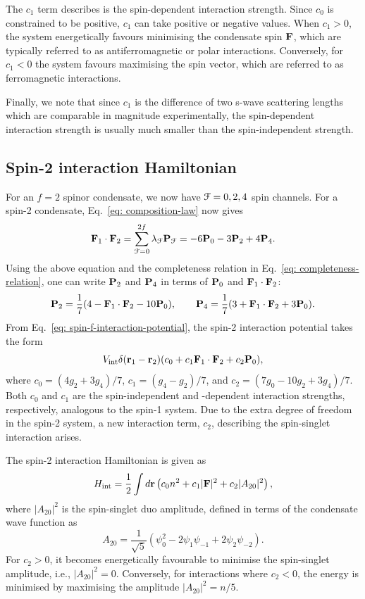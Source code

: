 The \(c_1\) term describes is the spin-dependent interaction strength.
Since \(c_0\) is constrained to be positive, \(c_1\) can take positive or
negative values.
When \(c_1 > 0\), the system energetically favours minimising the condensate
spin \(\vb{F}\), which are typically referred to as antiferromagnetic or polar
interactions.
Conversely, for \(c_1 < 0\) the system favours maximising the spin vector,
which are referred to as ferromagnetic interactions.

Finally, we note that since \(c_1\) is the difference of two s-wave scattering
lengths which are comparable in magnitude experimentally, the spin-dependent
interaction strength is usually much smaller than the spin-independent strength.

\subsection{Spin-2 interaction Hamiltonian}
For an \(f=2\) spinor condensate, we now have \(\EuScript{F}=0,2,4\) spin
channels.
For a spin-2 condensate, Eq.~\eqref{eq: composition-law} now gives
\begin{equation}
    \vb{F}_1 \cdot \vb{F}_2 = \sum_{\EuScript{F} = 0}^{2f}
    \lambda_\EuScript{F}\vb{P}_\EuScript{F} = -6\vb{P}_0-3\vb{P}_2+4\vb{P}_4.
\end{equation}
Using the above equation and the completeness relation in
Eq.~\eqref{eq: completeness-relation}, one can write \(\vb{P}_2\) and
\(\vb{P}_4\) in terms of \(\vb{P}_0\) and \(\vb{F}_1 \cdot \vb{F}_2\):
\begin{equation}
    \vb{P}_2 = \frac{1}{7}(4 - \vb{F}_1 \cdot \vb{F}_2 - 10\vb{P}_0), \qquad
    \vb{P}_4 = \frac{1}{7}(3 + \vb{F}_1 \cdot \vb{F}_2 + 3\vb{P}_0).
\end{equation}
From Eq.~\eqref{eq: spin-f-interaction-potential}, the spin-2 interaction
potential takes the form
\begin{equation}
    V_\mathrm{int}\delta(\vb{r}_1-\vb{r}_2)(c_0+c_1\vb{F}_1 \cdot \vb{F}_2 
    +c_2\vb{P}_0),
\end{equation}
where \(c_0=(4g_2+3g_4)/7\), \(c_1=(g_4-g_2)/7\), and
\(c_2=(7g_0-10g_2+3g_4)/7\).
Both \(c_0\) and \(c_1\) are the spin-independent and -dependent interaction
strengths, respectively, analogous to the spin-1 system.
Due to the extra degree of freedom in the spin-2 system, a new interaction term,
\(c_2\), describing the spin-singlet interaction arises.

The spin-2 interaction Hamiltonian is given as
\begin{equation}
    H_\mathrm{int} = \frac{1}{2}\int d\vb{r}\left(c_0n^2+c_1|\vb{F}|^2
    +c_2|A_{20}|^2\right),
\end{equation}
where \(|A_{20}|^2\) is the spin-singlet duo amplitude, defined in terms of
the condensate wave function as
\begin{equation}
    A_{20} = \frac{1}{\sqrt{5}}\left(\psi_0^2-2\psi_1\psi_{-1}
    +2\psi_2\psi_{-2}\right).
\end{equation}
For \(c_2 > 0\), it becomes energetically favourable to minimise the
spin-singlet amplitude, i.e., \(|A_{20}|^2 = 0\).
Conversely, for interactions where \(c_2 < 0\), the energy is minimised by
maximising the amplitude \(|A_{20}|^2=n/5\).

